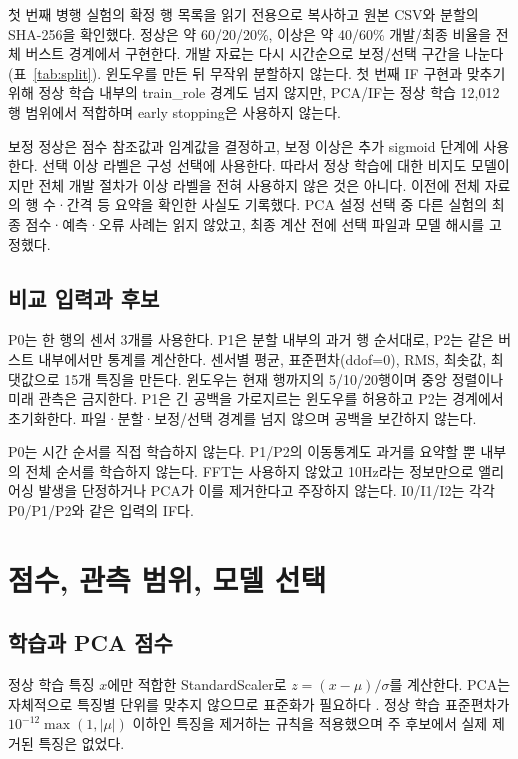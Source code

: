\documentclass{article}
\begin{document}
첫 번째 병행 실험의 확정 행 목록을 읽기 전용으로 복사하고 원본 CSV와 분할의 SHA-256을 확인했다. 정상은 약 60/20/20\%, 이상은 약 40/60\% 개발/최종 비율을 전체 버스트 경계에서 구현한다. 개발 자료는 다시 시간순으로 보정/선택 구간을 나눈다(표~\ref{tab:split}). 윈도우를 만든 뒤 무작위 분할하지 않는다. 첫 번째 IF 구현과 맞추기 위해 정상 학습 내부의 train\_role 경계도 넘지 않지만, PCA/IF는 정상 학습 12,012행 범위에서 적합하며 early stopping은 사용하지 않는다.

보정 정상은 점수 참조값과 임계값을 결정하고, 보정 이상은 추가 sigmoid 단계에 사용한다. 선택 이상 라벨은 구성 선택에 사용한다. 따라서 정상 학습에 대한 비지도 모델이지만 전체 개발 절차가 이상 라벨을 전혀 사용하지 않은 것은 아니다. 이전에 전체 자료의 행 수·간격 등 요약을 확인한 사실도 기록했다. PCA 설정 선택 중 다른 실험의 최종 점수·예측·오류 사례는 읽지 않았고, 최종 계산 전에 선택 파일과 모델 해시를 고정했다.

\subsection{비교 입력과 후보}
P0는 한 행의 센서 3개를 사용한다. P1은 분할 내부의 과거 행 순서대로, P2는 같은 버스트 내부에서만 통계를 계산한다. 센서별 평균, 표준편차(ddof=0), RMS, 최솟값, 최댓값으로 15개 특징을 만든다. 윈도우는 현재 행까지의 5/10/20행이며 중앙 정렬이나 미래 관측은 금지한다. P1은 긴 공백을 가로지르는 윈도우를 허용하고 P2는 경계에서 초기화한다. 파일·분할·보정/선택 경계를 넘지 않으며 공백을 보간하지 않는다.

P0는 시간 순서를 직접 학습하지 않는다. P1/P2의 이동통계도 과거를 요약할 뿐 내부의 전체 순서를 학습하지 않는다. FFT는 사용하지 않았고 10Hz라는 정보만으로 앨리어싱 발생을 단정하거나 PCA가 이를 제거한다고 주장하지 않는다. I0/I1/I2는 각각 P0/P1/P2와 같은 입력의 IF다.

\section{점수, 관측 범위, 모델 선택}
\subsection{학습과 PCA 점수}
정상 학습 특징 $x$에만 적합한 StandardScaler로 $z=(x-\mu)/\sigma$를 계산한다. PCA는 자체적으로 특징별 단위를 맞추지 않으므로 표준화가 필요하다 \citep{sklearnpca,sklearnscale}. 정상 학습 표준편차가 $10^{-12}\max(1,|\mu|)$ 이하인 특징을 제거하는 규칙을 적용했으며 주 후보에서 실제 제거된 특징은 없었다.
\end{document}
